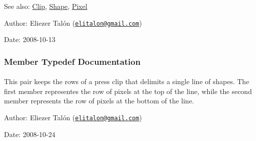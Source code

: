 \begin{Desc}
\item[See also:]\hyperlink{class_clip}{Clip}, \hyperlink{class_shape}{Shape}, \hyperlink{_shape_8hpp_535e59456e3e633842529cfa8ea103c4}{Pixel}\end{Desc}
\begin{Desc}
\item[Author:]Eliezer Talón (\href{mailto:elitalon@gmail.com}{\tt elitalon@gmail.com}) \end{Desc}
\begin{Desc}
\item[Date:]2008-10-13 \end{Desc}


\subsubsection{Member Typedef Documentation}
\hypertarget{class_segmenter_ae134abed2f1d55197820f4027d10999}{
\paragraph[{LineMarker}]{}\hfill}
\label{class_segmenter_ae134abed2f1d55197820f4027d10999}


This pair keeps the rows of a press clip that delimits a single line of shapes. The first member representes the row of pixels at the top of the line, while the second member represents the row of pixels at the bottom of the line.

\begin{Desc}
\item[Author:]Eliezer Talón (\href{mailto:elitalon@gmail.com}{\tt elitalon@gmail.com}) \end{Desc}
\begin{Desc}
\item[Date:]2008-10-24 \end{Desc}
\hypertarget{class_segmenter_b3190459e52101e495e49e936bbb6440}{
\paragraph[{LineMarkerIterator}]{}\hfill}
\label{class_segmenter_b3190459e52101e495e49e936bbb6440}


